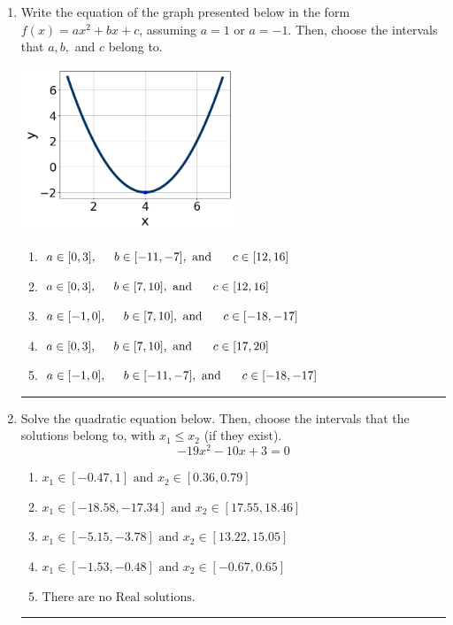 \documentclass[14pt]{extbook}
\newcommand{\litem}[1]{\item#1\hspace*{-1cm}\rule{\textwidth}{0.4pt}}
\begin{document}
\begin{enumerate}
{\begin{enumerate}[label=\Alph*.]
\end{enumerate} }
\litem{
Write the equation of the graph presented below in the form $f(x)=ax^2+bx+c$, assuming  $a=1$ or $a=-1$. Then, choose the intervals that $a, b,$ and $c$ belong to.
\begin{center}
    \includegraphics[width=0.5\textwidth]{../Figures/quadraticGraphToEquationCopyA.png}
\end{center}
\begin{enumerate}[label=\Alph*.]
\item \( a \in [0, 3], \hspace*{5mm} b \in [-11, -7], \text{ and } \hspace*{5mm} c \in [12, 16] \)
\item \( a \in [0, 3], \hspace*{5mm} b \in [7, 10], \text{ and } \hspace*{5mm} c \in [12, 16] \)
\item \( a \in [-1, 0], \hspace*{5mm} b \in [7, 10], \text{ and } \hspace*{5mm} c \in [-18, -17] \)
\item \( a \in [0, 3], \hspace*{5mm} b \in [7, 10], \text{ and } \hspace*{5mm} c \in [17, 20] \)
\item \( a \in [-1, 0], \hspace*{5mm} b \in [-11, -7], \text{ and } \hspace*{5mm} c \in [-18, -17] \)

\end{enumerate} }
\litem{
Solve the quadratic equation below. Then, choose the intervals that the solutions belong to, with $x_1 \leq x_2$ (if they exist).\[ -19x^{2} -10 x + 3 = 0 \]\begin{enumerate}[label=\Alph*.]
\item \( x_1 \in [-0.47, 1] \text{ and } x_2 \in [0.36, 0.79] \)
\item \( x_1 \in [-18.58, -17.34] \text{ and } x_2 \in [17.55, 18.46] \)
\item \( x_1 \in [-5.15, -3.78] \text{ and } x_2 \in [13.22, 15.05] \)
\item \( x_1 \in [-1.53, -0.48] \text{ and } x_2 \in [-0.67, 0.65] \)
\item \( \text{There are no Real solutions.} \)


\end{enumerate}}
\end{enumerate}
\end{document}
